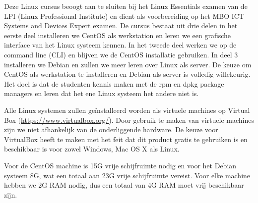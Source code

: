 Deze Linux cursus beoogt aan te sluiten bij het Linux Essentials examen van de LPI (Linux Professional Institute) en dient als voorbereiding op het MBO ICT Systems and Devices Expert examen. De cursus bestaat uit drie delen in het eerste deel installeren we CentOS als werkstation en leren we een grafische interface van het Linux systeem kennen. In het tweede deel werken we op de command line (CLI) en blijven we de CentOS installatie gebruiken. In deel 3 installeren we Debian en zullen we meer leren over Linux als server. De keuze om CentOS als werkstation te installeren en Debian als server is volledig willekeurig. Het doel is dat de studenten kennis maken met de rpm en dpkg package managers en leren dat het ene Linux systeem het andere niet is.

Alle Linux systemen zullen ge\"installeerd worden als virtuele machines op Virtual Box (\url{https://www.virtualbox.org/}). Door gebruik te maken van virtuele machines zijn we niet afhankelijk van de onderliggende hardware. De keuze voor VirtualBox heeft te maken met het feit dat dit product gratis te gebruiken is en beschikbaar is voor zowel Windows, Mac OS X als Linux.

Voor de CentOS machine is 15G vrije schijfruimte nodig en voor het Debian systeem 8G, wat een totaal aan 23G vrije schijfruimte vereist. Voor elke machine hebben we 2G RAM nodig, dus een totaal van 4G RAM moet vrij beschikbaar zijn.
